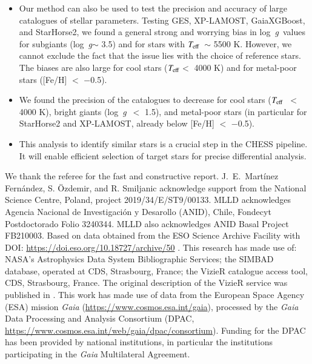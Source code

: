 \documentclass{aa}
\def\teff{$\textit{T}_{\rm{eff}}$}
\def\logg{\mbox{log~{\it g}}}
\begin{document}
\begin{itemize}
\item Our method can also be used to test the precision and accuracy of large catalogues of stellar parameters. Testing GES, XP-LAMOST, GaiaXGBoost, and StarHorse2, we found a general strong and worrying bias in \logg~values for subgiants (\logg $\sim$ 3.5) and for stars with \teff~$\sim$ 5500 K. However, we cannot exclude the fact that the issue lies with the choice of reference stars. The biases are also large for cool stars (\teff $<$ 4000 K) and for metal-poor stars ([Fe/H] $<$ $-$0.5). 

\item We found the precision of the catalogues to decrease for cool stars (\teff~$<$ 4000 K), bright giants (\logg~$<$ 1.5), and metal-poor stars (in particular for StarHorse2 and XP-LAMOST, already below [Fe/H] $<$ $-$0.5). 

\item This analysis to identify similar stars is a crucial step in the CHESS pipeline. It will enable efficient selection of target stars for precise differential analysis.
    
\end{itemize}

\begin{acknowledgements}
We thank the referee for the fast and constructive report. J.~E.~Mart\'{i}nez Fern\'andez, S. \"Ozdemir, and R. Smiljanic acknowledge support from the National Science Centre, Poland, project 2019/34/E/ST9/00133. MLLD acknowledges Agencia Nacional de Investigación y Desarollo (ANID), Chile, Fondecyt Postdoctorado Folio 3240344. MLLD also acknowledges ANID Basal Project FB210003.  Based on data obtained from the ESO Science Archive Facility with DOI: \url{https://doi.eso.org/10.18727/archive/50} \citep{UVESreduceddata}. This research has made use of: NASA’s Astrophysics Data System Bibliographic Services; the SIMBAD database, operated at CDS, Strasbourg, France; the VizieR catalogue access tool, CDS, Strasbourg, France. The original description of the VizieR service was published in \citet{vizier2000}. This work has made use of data from the European Space Agency (ESA) mission {\it Gaia} (\url{https://www.cosmos.esa.int/gaia}), processed by the {\it Gaia} Data Processing and Analysis Consortium (DPAC,
\url{https://www.cosmos.esa.int/web/gaia/dpac/consortium}). Funding for the DPAC has been provided by national institutions, in particular the institutions participating in the {\it Gaia} Multilateral Agreement.
\end{acknowledgements}
\end{document}
